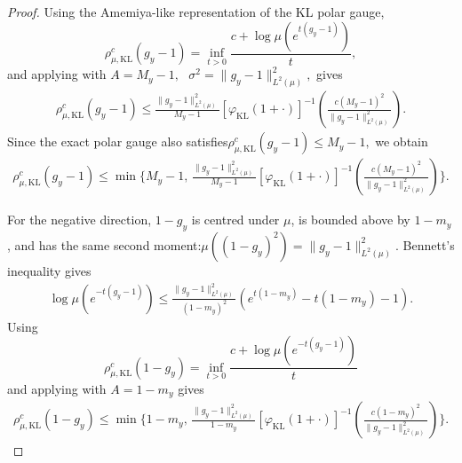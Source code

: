 \documentclass[11pt]{article}
\theoremstyle{plain}
\theoremstyle{remark}
\begin{document}
\begin{proof}
Using the Amemiya-like representation of the KL polar gauge,
\begin{equation}
    \rho_{\mu,\mathrm{KL}}^c(g_y-1)
    =
    \inf_{t>0}
    \frac{
        c+\log\mu\left(e^{t(g_y-1)}\right)
    }{t},
\end{equation}
and applying
with $
    A=M_y-1,
   \text{ }
    \sigma^2
    =
    \lVert g_y-1\rVert_{L^2(\mu)}^2,$
gives
\begin{align}
\rho_{\mu,\mathrm{KL}}^c(g_y-1)
\leq
\frac{
    \lVert g_y-1\rVert_{L^2(\mu)}^2
}{
    M_y-1
}
\left[
    \varphi_{\mathrm{KL}}(1+\cdot)
\right]^{-1}
\left(
    \frac{
        c(M_y-1)^2
    }{
        \lVert g_y-1\rVert_{L^2(\mu)}^2
    }
\right).
\end{align}
Since the exact polar gauge also satisfies$
    \rho_{\mu,\mathrm{KL}}^c(g_y-1)
    \leq
    M_y-1,$
we obtain
\begin{align}
\rho_{\mu,\mathrm{KL}}^c(g_y-1)
\leq
\min\Bigg\{
M_y-1,\,
\frac{
    \lVert g_y-1\rVert_{L^2(\mu)}^2
}{
    M_y-1
}
\left[
    \varphi_{\mathrm{KL}}(1+\cdot)
\right]^{-1}
\left(
    \frac{
        c(M_y-1)^2
    }{
        \lVert g_y-1\rVert_{L^2(\mu)}^2
    }
\right)
\Bigg\}.
\label{eq:klPositivePolarGaugeBennett}
\end{align}

For the negative direction, $1-g_y$ is centred under $\mu$, is
bounded above by $1-m_y$, and has the same second moment:$
    \mu\left((1-g_y)^2\right)
    =
    \lVert g_y-1\rVert_{L^2(\mu)}^2.$
Bennett's inequality gives
\begin{align}
\log\mu\left(e^{-t(g_y-1)}\right)
\leq
\frac{
    \lVert g_y-1\rVert_{L^2(\mu)}^2
}{
    (1-m_y)^2
}
\left(
    e^{t(1-m_y)}
    -
    t(1-m_y)
    -
    1
\right).
\label{eq:klNegativeMGFBennett}
\end{align}
Using
\begin{equation}
    \rho_{\mu,\mathrm{KL}}^c(1-g_y)
    =
    \inf_{t>0}
    \frac{
        c+\log\mu\left(e^{-t(g_y-1)}\right)
    }{t}
\end{equation}
and applying
with $A=1-m_y$ gives
\begin{align}
\rho_{\mu,\mathrm{KL}}^c(1-g_y)
\leq
\min\Bigg\{
1-m_y,\,
\frac{
    \lVert g_y-1\rVert_{L^2(\mu)}^2
}{
    1-m_y
}
\left[
    \varphi_{\mathrm{KL}}(1+\cdot)
\right]^{-1}
\left(
    \frac{
        c(1-m_y)^2
    }{
        \lVert g_y-1\rVert_{L^2(\mu)}^2
    }
\right)
\Bigg\}.
\label{eq:klNegativePolarGaugeBennett}
\end{align}


\end{proof}
\end{document}
